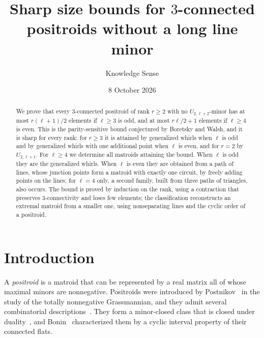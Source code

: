 \documentclass[11pt]{amsart}
\theoremstyle{definition}
\theoremstyle{remark}
\numberwithin{equation}{section}
\begin{document}
\title[Sharp size bounds for $3$-connected positroids]{Sharp size bounds for $3$-connected positroids without a long line minor}
\author{Knowledge Sense}
\address{Knowledge Sense}
\date{8 October 2026}

\begin{abstract}
We prove that every $3$-connected positroid of rank $r\ge2$ with no $U_{2,\ell+2}$-minor has at most $r(\ell+1)/2$ elements if $\ell\ge3$ is odd, and at most $r\ell/2+1$ elements if $\ell\ge4$ is even. This is the parity-sensitive bound conjectured by Boretsky and Walsh, and it is sharp for every rank: for $r\ge3$ it is attained by generalized whirls when $\ell$ is odd and by generalized whirls with one additional point when $\ell$ is even, and for $r=2$ by $U_{2,\ell+1}$. For $\ell\ge4$ we determine all matroids attaining the bound. When $\ell$ is odd they are the generalized whirls. When $\ell$ is even they are obtained from a path of lines, whose junction points form a matroid with exactly one circuit, by freely adding points on the lines; for $\ell=4$ only, a second family, built from three paths of triangles, also occurs. The bound is proved by induction on the rank, using a contraction that preserves $3$-connectivity and loses few elements; the classification reconstructs an extremal matroid from a smaller one, using nonseparating lines and the cyclic order of a positroid.
\end{abstract}

\maketitle

\section{Introduction}

A \emph{positroid} is a matroid that can be represented by a real matrix all of whose maximal minors are nonnegative. Positroids were introduced by Postnikov~\cite{Pos06} in the study of the totally nonnegative Grassmannian, and they admit several combinatorial descriptions~\cite{ARW16,Pos06}. They form a minor-closed class that is closed under duality~\cite{ARW16}, and Bonin~\cite{Bon24} characterized them by a cyclic interval property of their connected flats.
\end{document}
